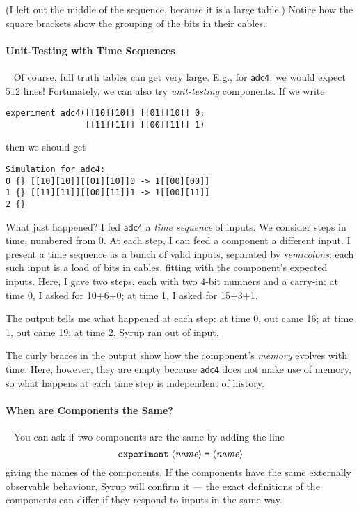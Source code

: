 \documentclass{article}
\newcommand{\C}{\mathsf}
\begin{document}
(I left out the middle of the sequence, because it is a large table.)
Notice how the square brackets show the grouping of the bits in their
cables.

\paragraph{Unit-Testing with Time Sequences}~
Of course, full truth tables can get very large. E.g., for $\C{adc4}$,
we would expect 512 lines! Fortunately, we can also try
\emph{unit-testing} components. If we write
\begin{verbatim}
experiment adc4([[10][10]] [[01][10]] 0;
                [[11][11]] [[00][11]] 1)
\end{verbatim}
then we should get
\begin{verbatim}
Simulation for adc4:
0 {} [[10][10]][[01][10]]0 -> 1[[00][00]]
1 {} [[11][11]][[00][11]]1 -> 1[[00][11]]
2 {}
\end{verbatim}

What just happened? I fed $\C{adc4}$ a \emph{time sequence} of inputs.
We consider steps in time, numbered from 0. At each step, I can feed
a component a different input.  I present a time
sequence as a bunch of valid inputs, separated by \emph{semicolons}:
each such input is a load of bits in cables, fitting with the
component's expected inputs. Here, I gave two steps, each with two
4-bit numners and a carry-in: at time 0, I
asked for 10+6+0; at time 1, I asked for 15+3+1.

The output tells me what happened at each step: at time 0, out came
16; at time 1, out came 19; at time 2, Syrup ran out of input.

The curly braces in the output show how the component's \emph{memory}
evolves with time. Here, however, they are empty because $\C{adc4}$
does not make use of memory, so what happens at each time step is
independent of history.


\paragraph{When are Components the Same?}~
You can ask if two components are the same by adding the line
\[
\texttt{experiment}\; \langle\mathit{name}\rangle\;\texttt{=}\;\langle\mathit{name}\rangle
\]
giving the names of the components. If the components
have the same externally observable behaviour, Syrup will
confirm it --- the exact definitions of the components
can differ if they respond to inputs in the same way.
\end{document}
